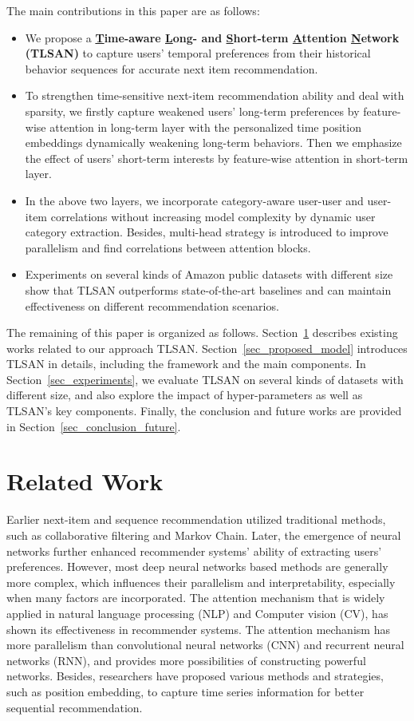 \documentclass[preprint,12pt]{elsarticle}
\newcommand{\tool}{TLSAN\xspace}
\begin{document}
\begin{sloppypar}
The main contributions in this paper are as follows:
\begin{itemize}
	\item We propose a \textbf{\underline{T}ime-aware \underline{L}ong- and \underline{S}hort-term \underline{A}ttention \underline{N}etwork (\tool)} to capture users' temporal preferences from their historical behavior sequences for accurate next item recommendation.
	\item To strengthen time-sensitive next-item recommendation ability and deal with sparsity, we firstly capture weakened users' long-term preferences by feature-wise attention in long-term layer with the personalized time position embeddings dynamically weakening long-term behaviors. Then we emphasize the effect of users' short-term interests by feature-wise attention in short-term layer. 
	\item In the above two layers, we incorporate category-aware user-user and user-item correlations without increasing model complexity by dynamic user category extraction. Besides, multi-head strategy is introduced to improve parallelism and find correlations between attention blocks. 
	\item Experiments on several kinds of Amazon public datasets with different size show that \tool outperforms state-of-the-art baselines and can maintain effectiveness on different recommendation scenarios.
\end{itemize}

The remaining of this paper is organized as follows. Section~\ref{sec_related_work} describes existing works related to our approach \tool. Section~\ref{sec_proposed_model} introduces \tool in details, including the framework and the main components. In Section~\ref{sec_experiments}, we evaluate \tool on several kinds of datasets with different size, and also explore the impact of hyper-parameters as well as \tool's key components. Finally, the conclusion and future works are provided in Section~\ref{sec_conclusion_future}.

\section{Related Work}
\label{sec_related_work}
Earlier next-item and sequence recommendation utilized traditional methods, such as collaborative filtering and Markov Chain. Later, the emergence of neural networks further enhanced recommender systems' ability of extracting users' preferences. However, most deep neural networks based methods are generally more complex, which influences their parallelism and interpretability, especially when many factors are incorporated. The attention mechanism that is widely applied in natural language processing (NLP) and Computer vision (CV), has shown its effectiveness in recommender systems. The attention mechanism has more parallelism than convolutional neural networks (CNN) and recurrent neural networks (RNN), and provides more possibilities of constructing powerful networks. Besides, researchers have proposed various methods and strategies, such as position embedding, to capture time series information for better sequential recommendation.


\end{sloppypar}
\end{document}
